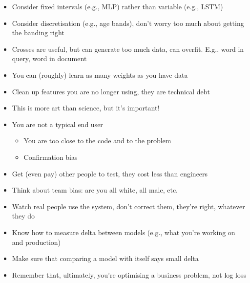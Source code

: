 
\begin{itemize}
\item Consider fixed intervals (e.g., MLP) rather than variable (e.g.,
  LSTM)
\item Consider discretisation (e.g., age bands), don't worry too much
  about getting the banding right
\item Crosses are useful, but can generate too much data, can
  overfit.  E.g., word in query, word in document
\item You can (roughly) learn as many weights as you have data
\item Clean up features you are no longer using, they are technical debt
\end{itemize}


\begin{itemize}
\item This is more art than science, but it's important!
\item You are not a typical end user
  \begin{itemize}
  \item You are too close to the code and to the problem
  \item Confirmation bias
  \end{itemize}
\item Get (even pay) other people to test, they cost less than
  engineers
\item Think about team bias: are you all white, all male, etc.
\item Watch real people use the system, don't correct them, they're
  right, whatever they do
\end{itemize}


\begin{itemize}
\item Know how to measure delta between models (e.g., what you're
  working on and production)
\item Make sure that comparing a model with itself says small delta
\item Remember that, ultimately, you're optimising a business problem,
  not log loss
\end{itemize}


